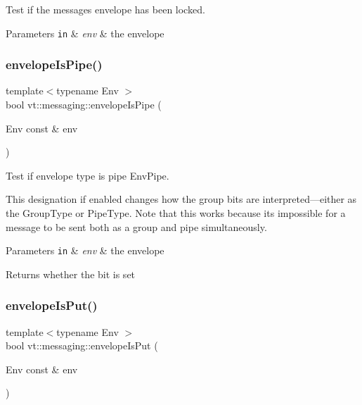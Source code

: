 Test if the message\textquotesingle{}s envelope has been locked. 


\begin{DoxyParams}[1]{Parameters}
\mbox{\tt in}  & {\em env} & the envelope \\
\hline
\end{DoxyParams}
\mbox{\label{namespacevt_1_1messaging_af97867f7e468ce73a69cd228404c47b0}} 
\subsubsection{\texorpdfstring{envelope\+Is\+Pipe()}{envelopeIsPipe()}}
{\footnotesize\ttfamily template$<$typename Env $>$ \\
bool vt\+::messaging\+::envelope\+Is\+Pipe (\begin{DoxyParamCaption}\item[{Env const \&}]{env }\end{DoxyParamCaption})\hspace{0.3cm}{\ttfamily [inline]}}



Test if envelope type is pipe {\ttfamily Env\+Pipe}. 

This designation if enabled changes how the group bits are interpreted---either as the {\ttfamily Group\+Type} or {\ttfamily Pipe\+Type}. Note that this works because its impossible for a message to be sent both as a group and pipe simultaneously.


\begin{DoxyParams}[1]{Parameters}
\mbox{\tt in}  & {\em env} & the envelope\\
\hline
\end{DoxyParams}
\begin{DoxyReturn}{Returns}
whether the bit is set 
\end{DoxyReturn}
\mbox{\label{namespacevt_1_1messaging_a0a46a75d45e4f2ad55df0f8b2c2a5f2b}} 
\subsubsection{\texorpdfstring{envelope\+Is\+Put()}{envelopeIsPut()}}
{\footnotesize\ttfamily template$<$typename Env $>$ \\
bool vt\+::messaging\+::envelope\+Is\+Put (\begin{DoxyParamCaption}\item[{Env const \&}]{env }\end{DoxyParamCaption})\hspace{0.3cm}{\ttfamily [inline]}}



